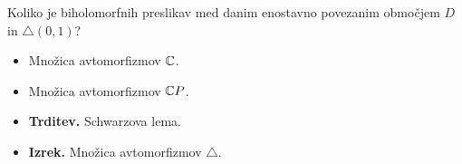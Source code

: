 \begin{enumerate}
    Koliko je biholomorfnih preslikav med danim enostavno povezanim območjem \(D\) in \(\triangle(0, 1)\)?
    \begin{itemize}
        \item Množica avtomorfizmov \(\mathbb{C}\).
        \item Množica avtomorfizmov \(\mathbb{C} P\).
        \item \textbf{Trditev.} Schwarzova lema.
        \item \textbf{Izrek.} Množica avtomorfizmov \(\triangle\).
    \end{itemize}
\end{enumerate}